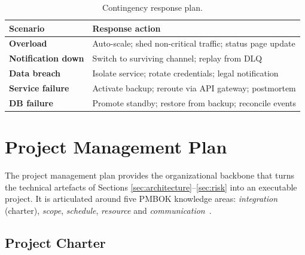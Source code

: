\documentclass[conference,a4paper,10pt]{IEEEtran}
\begin{document}
\begin{table}[H]
\centering
\caption{Contingency response plan.}
\label{tab:contingency}
\renewcommand{\arraystretch}{1.2}
\footnotesize
\begin{tabularx}{\columnwidth}{>{\bfseries}lX}
\toprule
\rowcolor{tableheader} Scenario & Response action \\
\midrule
Overload         & Auto-scale; shed non-critical traffic; status page update \\
Notification down& Switch to surviving channel; replay from DLQ \\
Data breach      & Isolate service; rotate credentials; legal notification \\
Service failure  & Activate backup; reroute via API gateway; postmortem \\
DB failure       & Promote standby; restore from backup; reconcile events \\
\bottomrule
\end{tabularx}
\end{table}

\section{Project Management Plan}
\label{sec:pm}

The project management plan provides the organizational backbone that turns
the technical artefacts of Sections \ref{sec:architecture}--\ref{sec:risk}
into an executable project. It is articulated around five PMBOK knowledge
areas: \emph{integration} (charter), \emph{scope}, \emph{schedule},
\emph{resource} and \emph{communication}~\cite{pmbok}.

\subsection{Project Charter}
\end{document}
